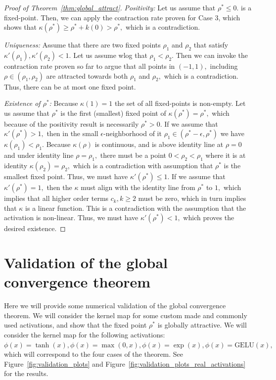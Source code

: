 \documentclass[twoside]{article}
\theoremstyle{definition}
\begin{document}
\begin{proof}[Proof of Theorem~\ref{thm:global_attract}]
\textit{Positivity:} Let us assume that $\rho^* \le 0.$ is a fixed-point. Then, we can apply the contraction rate proven for Case 3, which shows that $\kappa(\rho^*)\ge \rho^* + k(0) > \rho^*,$ which is a contradiction.


\textit{Uniqueness:} Assume that there are two fixed points $\rho_1$ and $\rho_2$ that satisfy $\kappa'(\rho_1),\kappa'(\rho_2)<1.$ Let us assume wlog that $\rho_1 < \rho_2.$ Then we can invoke the contraction rate proven so far to argue that all points in $(-1,1),$ including  $\rho\in (\rho_1,\rho_2)$ are attracted towards both $\rho_1$ and $\rho_2,$ which is a contradiction. Thus, there can be at most one fixed point.

\textit{Existence of $\rho^*$:} Because $\kappa(1)=1$ the set of all fixed-points is non-empty. Let us assume that $\rho^*$ is the first (smallest) fixed point of $\kappa(\rho^*) = \rho^*,$ which because of the positivity result is necessarily $\rho^*>0.$ If we assume that $\kappa'(\rho^*) > 1,$ then in the small $\epsilon$-neighborhood of it $\rho_1 \in(\rho^*-\epsilon,\rho^*)$ we have $\kappa(\rho_1) < \rho_1.$ Because $\kappa(\rho)$ is continuous, and is above identity line at $\rho=0$ and under identity line $\rho=\rho_1,$ there must be a point $0 < \rho_2 < \rho_1$ where it is at identity $\kappa(\rho_2) = \rho_2,$ which is a contradiction with assumption that $\rho^*$ is the smallest fixed point. Thus, we must have $\kappa'(\rho^*) \le 1.$ If we assume that $\kappa'(\rho^*) = 1,$ then the $\kappa$ must align with the identity line from $\rho^*$ to $1,$ which implies that all higher order terms $c_k,k\ge 2$ must be zero, which in turn implies that $\kappa$ is a linear function. This is a contradiction with the assumption that the activation is non-linear. Thus, we must have $\kappa'(\rho^*) < 1,$ which proves the desired existence. 
\end{proof}

\section{Validation of the global convergence theorem}
Here we will provide some numerical validation of the global convergence theorem. We will consider the kernel map for some custom made and commonly used activations, and show that the fixed point $\rho^*$ is globally attractive. We will consider the kernel map for the following activations: $\phi(x) = \tanh(x), \phi(x) = \max(0,x), \phi(x) = \exp(x), \phi(x) = \text{GELU}(x),$ which will correspond to the four cases of the theorem. See Figure~\ref{fig:validation_plots} and Figure~\ref{fig:validation_plots_real_activations} for the results.
\end{document}
